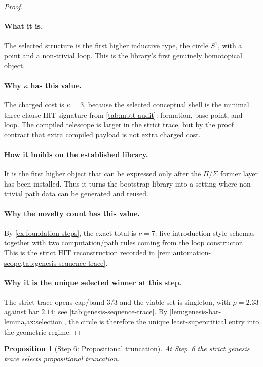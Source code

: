 \documentclass[11pt,a4paper]{article}
\theoremstyle{plain}
\newtheorem{proposition}[theorem]{Proposition}
\theoremstyle{definition}
\theoremstyle{remark}
\begin{document}
\begin{proof}
\paragraph{What it is.}
The selected structure is the first higher inductive type, the circle $S^1$,
with a point and a non-trivial loop.
This is the library's first genuinely homotopical object.

\paragraph{Why $\kappa$ has this value.}
The charged cost is $\kappa=3$, because the selected conceptual shell is the
minimal three-clause HIT signature from \cref{tab:mbtt-audit}: formation,
base point, and loop.
The compiled telescope is larger in the strict trace, but by the proof contract
that extra compiled payload is not extra charged cost.

\paragraph{How it builds on the established library.}
It is the first higher object that can be expressed only after the
$\Pi/\Sigma$ former layer has been installed.
Thus it turns the bootstrap library into a setting where non-trivial path data
can be generated and reused.

\paragraph{Why the novelty count has this value.}
By \cref{ex:foundation-steps}, the exact total is $\nu=7$:
five introduction-style schemas together with two computation/path rules coming
from the loop constructor.
This is the strict HIT reconstruction recorded in
\cref{rem:automation-scope,tab:genesis-sequence-trace}.

\paragraph{Why it is the unique selected winner at this step.}
The strict trace opens cap/band $3/3$ and the viable set is singleton, with
$\rho=2.33$ against bar $2.14$; see \cref{tab:genesis-sequence-trace}.
By \cref{lem:genesis-bar-lemma,ax:selection}, the circle is therefore the
unique least-supercritical entry into the geometric regime.
\end{proof}

\begin{proposition}[Step 6: Propositional truncation]
\label{prop:genesis-step6}
At Step~6 the strict genesis trace selects propositional truncation.
\end{proposition}
\end{document}

